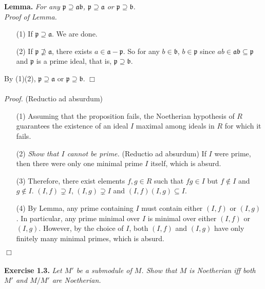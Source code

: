 \documentclass{article}
\begin{document}
\textbf{Lemma.}
\emph{For any $\mathfrak{p} \supseteq \mathfrak{a} \mathfrak{b}$,
$\mathfrak{p} \supseteq \mathfrak{a}$ or $\mathfrak{p} \supseteq \mathfrak{b}$.} \\

\emph{Proof of Lemma.}
\begin{enumerate}
\item[(1)] If $\mathfrak{p} \supseteq \mathfrak{a}$. We are done.
\item[(2)] If $\mathfrak{p} \not\supseteq \mathfrak{a}$,
there exists $a \in \mathfrak{a} - \mathfrak{p}$.
So for any $b \in \mathfrak{b}$, $b \in \mathfrak{p}$
since $ab \in \mathfrak{ab} \subseteq \mathfrak{p}$ and $\mathfrak{p}$ is a prime ideal,
that is, $\mathfrak{p} \supseteq \mathfrak{b}$.
\end{enumerate}
By (1)(2), $\mathfrak{p} \supseteq \mathfrak{a}$ or $\mathfrak{p} \supseteq \mathfrak{b}$.
$\Box$ \\\\



\emph{Proof.}
(Reductio ad absurdum)
\begin{enumerate}
\item[(1)]
Assuming that the proposition fails, the Noetherian hypothesis of $R$
guarantees the existence of an ideal $I$ maximal among ideals in $R$ for which it fails.
\item[(2)]
\emph{Show that $I$ cannot be prime.}
(Reductio ad absurdum)
If $I$ were prime,
then there were only one minimal prime $I$ itself, which is absurd.
\item[(3)]
Therefore, there exist elements $f, g \in R$ such that $fg \in I$
but $f \not\in I$ and $g \not\in I$.
$(I,f) \supsetneq I$, $(I,g) \supsetneq I$ and $(I,f)(I,g) \subseteq I$.
\item[(4)]
By Lemma, any prime containing $I$ must contain either $(I,f)$ or $(I,g)$.
In particular, any prime minimal over $I$ is minimal over either $(I,f)$ or $(I,g)$.
However, by the choice of $I$,
both $(I,f)$ and $(I,g)$ have only finitely many minimal primes,
which is absurd.
\end{enumerate}
$\Box$ \\\\






\textbf{Exercise 1.3.}
\emph{Let $M'$ be a submodule of $M$.
Show that $M$ is Noetherian iff both $M'$ and $M/M'$ are Noetherian.} \\
\end{document}
